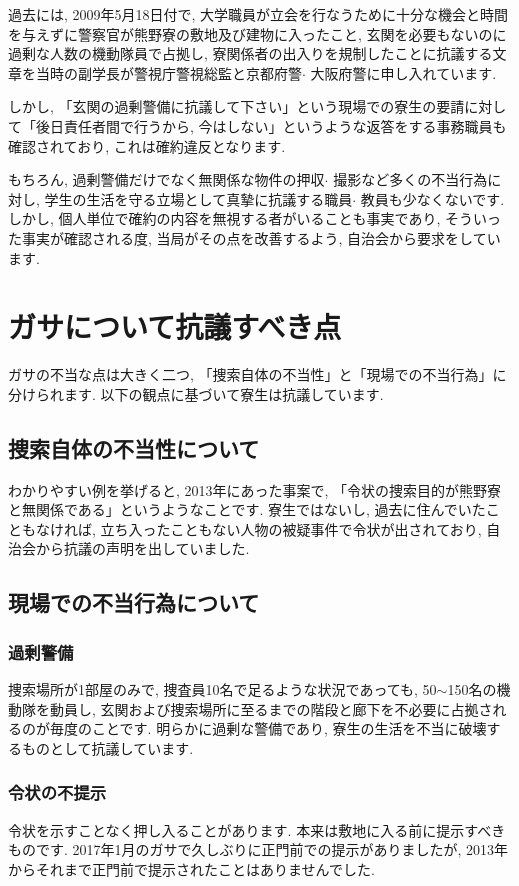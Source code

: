 \documentclass[10pt,b5jsbook,dvips,dvipdfmx,openany]{jsbook}
\theoremstyle{definition}
\begin{document}
		過去には, 2009年5月18日付で, 大学職員が立会を行なうために十分な機会と時間を与えずに警察官が熊野寮の敷地及び建物に入ったこと, 玄関を必要もないのに過剰な人数の機動隊員で占拠し, 寮関係者の出入りを規制したことに抗議する文章を当時の副学長が警視庁警視総監と京都府警$ \cdot $ 大阪府警に申し入れています.

 		しかし, 「玄関の過剰警備に抗議して下さい」という現場での寮生の要請に対して「後日責任者間で行うから, 今はしない」というような返答をする事務職員も確認されており, これは確約違反となります.

 		もちろん, 過剰警備だけでなく無関係な物件の押収$ \cdot $ 撮影など多くの不当行為に対し, 学生の生活を守る立場として真摯に抗議する職員$ \cdot $ 教員も少なくないです. しかし, 個人単位で確約の内容を無視する者がいることも事実であり, そういった事実が確認される度, 当局がその点を改善するよう, 自治会から要求をしています.


	\section{ガサについて抗議すべき点}
	ガサの不当な点は大きく二つ, 「捜索自体の不当性」と「現場での不当行為」に分けられます. 以下の観点に基づいて寮生は抗議しています.

		\subsection{捜索自体の不当性について}
		 わかりやすい例を挙げると, 2013年にあった事案で, 「令状の捜索目的が熊野寮と無関係である」というようなことです. 寮生ではないし, 過去に住んでいたこともなければ, 立ち入ったこともない人物の被疑事件で令状が出されており, 自治会から抗議の声明を出していました.

		\subsection{現場での不当行為について}
			\subsubsection{過剰警備}
			捜索場所が1部屋のみで, 捜査員10名で足るような状況であっても, 50$\sim$150名の機動隊を動員し, 玄関および捜索場所に至るまでの階段と廊下を不必要に占拠されるのが毎度のことです. 明らかに過剰な警備であり, 寮生の生活を不当に破壊するものとして抗議しています.

			\subsubsection{令状の不提示}
			令状を示すことなく押し入ることがあります. 本来は敷地に入る前に提示すべきものです. 2017年1月のガサで久しぶりに正門前での提示がありましたが, 2013年からそれまで正門前で提示されたことはありませんでした.
\end{document}
